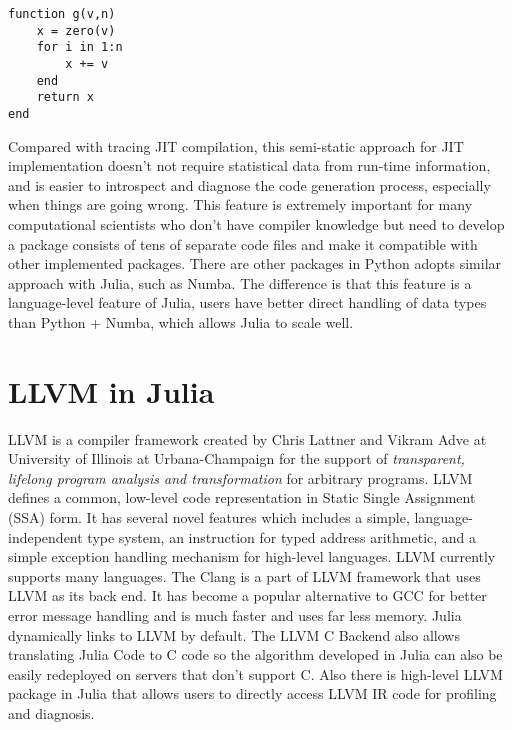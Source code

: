 \documentclass[11pt]{article}
\begin{document}
\begin{lstlisting}
function g(v,n) 
    x = zero(v)
    for i in 1:n
        x += v
    end
    return x
end
\end{lstlisting}

Compared with tracing JIT compilation, this semi-static approach for JIT implementation doesn't not require statistical data from run-time information, and is easier to introspect and diagnose the code generation process, especially when things are going wrong. This feature is extremely important for many computational scientists who don't have compiler knowledge but need to develop a package consists of tens of separate code files and make it compatible with other implemented packages. There are other packages in Python adopts similar approach with Julia, such as Numba. The difference is that this feature is a language-level feature of Julia, users have better direct handling of data types than Python + Numba, which allows Julia to scale well.



\section{LLVM in Julia}
LLVM is a compiler framework created by Chris Lattner and Vikram Adve at University of Illinois at Urbana-Champaign for the support of \textit{transparent, lifelong program analysis and transformation} for arbitrary programs. \cite{Lattner:2004:LCF:977395.977673}
LLVM defines a common, low-level code representation in Static Single Assignment (SSA) form. It has several novel features which includes a simple, language-independent type system, an instruction for typed address arithmetic, and a simple exception handling mechanism for high-level languages. LLVM currently supports many languages. The Clang is a part of LLVM framework that uses LLVM as its back end. It has become a popular alternative to GCC for better error message handling and is much faster and uses far less memory. Julia dynamically links to LLVM by default. The LLVM C Backend also allows translating Julia Code to C code so the algorithm developed in Julia can also be easily redeployed on servers that don't support C. Also there is high-level LLVM package in Julia that allows users to directly access LLVM IR code for profiling and diagnosis. 
\end{document}
